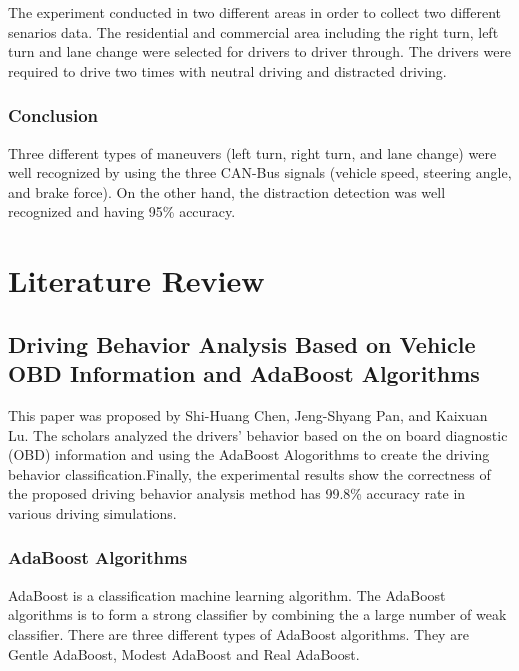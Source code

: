 The experiment conducted in two different areas in order to collect two different senarios data. The residential and commercial area including the right turn, left turn and lane change were selected for drivers to driver through. The drivers were required to drive two times with neutral driving and distracted driving. 
 
\subsubsection{Conclusion}
Three different types of maneuvers (left turn, right turn, and lane change) were well recognized by using the three CAN-Bus signals (vehicle speed, steering angle, and brake force). On the other hand, the distraction detection was well recognized and having 95\% accuracy.

\section{Literature Review}
\subsection{Driving Behavior Analysis Based on Vehicle OBD Information and AdaBoost Algorithms}
This paper was proposed by Shi-Huang Chen, Jeng-Shyang Pan, and Kaixuan Lu. The scholars analyzed the drivers' behavior based on the on board diagnostic (OBD) information and using the AdaBoost Alogorithms to create the driving  behavior classification.Finally, the experimental results show the correctness of the proposed driving behavior analysis method has 99.8\% accuracy rate in various driving simulations.

\subsubsection{AdaBoost Algorithms}
AdaBoost is a classification machine learning algorithm. The AdaBoost algorithms is to form a strong classifier by combining the a large number of weak classifier. There are three different types of AdaBoost algorithms. They are Gentle AdaBoost, Modest AdaBoost and Real AdaBoost.

